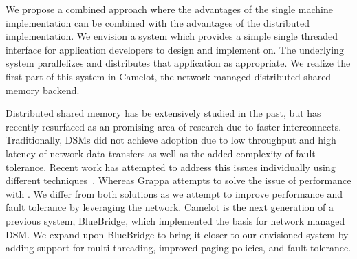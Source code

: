 We propose a combined approach where the advantages of the single machine
implementation can be combined with the advantages of the distributed
implementation. We envision a system which provides a simple single threaded
interface for application developers to design and implement on. The underlying
system parallelizes and distributes that application as appropriate. 
We realize
the first part of this system in Camelot, the network managed distributed shared
memory backend. 

Distributed shared memory has be extensively studied in the past, but has
recently resurfaced as an promising area of research due to faster
interconnects. Traditionally, DSMs did not achieve adoption due to low
throughput and high latency of network data transfers as well as the added
complexity of fault tolerance. Recent work has attempted to address this issues
individually using different techniques~\cite{Ongaro2011,Nelson2015}. 
Whereas Grappa attempts to solve the issue of performance
with . 
We differ from both solutions as we attempt to improve
performance and fault tolerance by leveraging the network. 
Camelot is the next generation of a previous system, BlueBridge, which
implemented the basis for network managed DSM. We expand upon BlueBridge to
bring it closer to our envisioned system by adding support for multi-threading,
improved paging policies, and fault tolerance.


